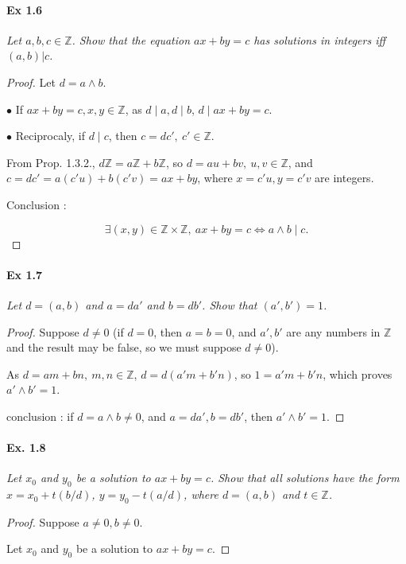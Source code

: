 \documentclass[11pt,a4paper]{article}
\newcommand{\Z}{\mathbb{Z}}
\begin{document}
{\paragraph {  Ex 1.6} 
{\it Let $a, b, c \in \Z$. Show that the equation $ax + by = c$ has solutions in integers iff $(a, b) |c$.
 }
 \begin{proof}
 Let $d = a \wedge b$. 
 
 $\bullet$ If $a x + by = c, x,y \in \Z$, as $d \mid a, d \mid b$, $d \mid ax + by = c$.
 
 $\bullet$ Reciprocaly, if $d \mid c$, then $c = d c',\ c' \in \Z$. 
 
 From Prop. 1.3.2., $d\Z = a \Z + b\Z$, so $d = a u + b v,\ u,v \in \Z$, and $c = dc' = a (c'u) + b (c'v) =a x + b y$, where $x = c' u, y = c' v$ are integers.
 
 Conclusion : 
 
 $$\exists (x,y) \in \Z \times \Z, \ ax + by = c \iff a\wedge b \mid c.$$
\end{proof}

\paragraph {  Ex 1.7} 
{\it Let $d = (a, b)$ and $a = da'$ and $b = db'$. Show that $(a', b') = 1$.}

\begin{proof}
Suppose $d \neq 0$ (if $d = 0$, then $a= b = 0$, and $a', b'$ are any numbers in $\Z$ and the result may be false, so we must suppose $d \neq 0$).

As $d = am + b n,\ m,n \in \Z$, $d = d(a'm + b' n)$, so $1 = a' m +b' n$, which proves $a' \wedge b' = 1$.

conclusion : if $d = a \wedge b \neq 0$, and $a = da', b = db'$, then $a'\wedge b' = 1$.

\end{proof}
\paragraph{Ex. 1.8}

{\it Let $x_0$ and $y_0$ be a solution to $ax + by = c$. Show that all solutions have the form $x = x_0 + t(b/d)$, $y = y_0 - t(a/d)$, where $d = (a, b)$ and $t \in \Z$.
}

\begin{proof}
Suppose $a\neq 0, b \neq 0$.

Let $x_0$ and $y_0$ be a solution to $ax + by = c$.


\end{proof}}
\end{document}
